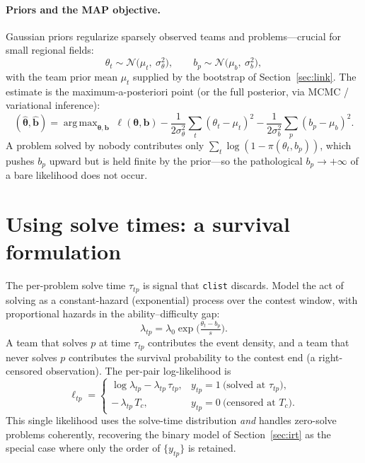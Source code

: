 \documentclass[11pt]{article}
\DeclareMathOperator*{\argmax}{arg\,max}
\theoremstyle{definition}
\begin{document}
\paragraph{Priors and the MAP objective.}
Gaussian priors regularize sparsely observed teams and problems---crucial for
small regional fields:
\begin{equation}\label{eq:priors}
  \theta_t \sim \mathcal{N}\big(\mu_t,\ \sigma_\theta^2\big),
  \qquad
  b_p \sim \mathcal{N}\big(\mu_b,\ \sigma_b^2\big),
\end{equation}
with the team prior mean $\mu_t$ supplied by the bootstrap of
Section~\ref{sec:link}. The estimate is the maximum-a-posteriori point (or the
full posterior, via MCMC / variational inference):
\begin{equation}\label{eq:map}
  (\hat{\bm\theta}, \hat{\bm b})
  = \argmax_{\bm\theta,\bm b}\;
    \ell(\bm\theta,\bm b)
    - \frac{1}{2\sigma_\theta^2}\sum_t (\theta_t-\mu_t)^2
    - \frac{1}{2\sigma_b^2}\sum_p (b_p-\mu_b)^2 .
\end{equation}
A problem solved by nobody contributes only $\sum_t \log(1-\pi(\theta_t,b_p))$,
which pushes $b_p$ upward but is held finite by the prior---so the pathological
$b_p\to+\infty$ of a bare likelihood does not occur.

\section{Using solve times: a survival formulation}\label{sec:survival}

The per-problem solve time $\tau_{tp}$ is signal that \texttt{clist} discards.
Model the act of solving as a constant-hazard (exponential) process over the
contest window, with proportional hazards in the ability--difficulty gap:
\begin{equation}\label{eq:hazard}
  \lambda_{tp} = \lambda_0 \exp\!\Big(\tfrac{\theta_t - b_p}{s}\Big).
\end{equation}
A team that solves $p$ at time $\tau_{tp}$ contributes the event density, and a
team that never solves $p$ contributes the survival probability to the contest
end (a right-censored observation). The per-pair log-likelihood is
\begin{equation}\label{eq:survlik}
  \ell_{tp} =
  \begin{cases}
    \log \lambda_{tp} - \lambda_{tp}\,\tau_{tp}, & y_{tp}=1 \ \text{(solved at } \tau_{tp}),\\[4pt]
    -\,\lambda_{tp}\, T_c, & y_{tp}=0 \ \text{(censored at } T_c).
  \end{cases}
\end{equation}
This single likelihood uses the solve-time distribution \emph{and} handles
zero-solve problems coherently, recovering the binary model of
Section~\ref{sec:irt} as the special case where only the order of
$\{y_{tp}\}$ is retained.
\end{document}
